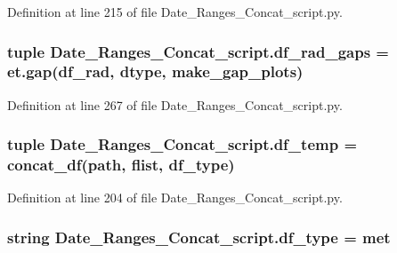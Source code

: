 Definition at line 215 of file Date\+\_\+\+Ranges\+\_\+\+Concat\+\_\+script.\+py.

\hypertarget{namespace_date___ranges___concat__script_a51d248766e4b3ed7f69e33a65a3e3e16}{}
\subsubsection[{df\+\_\+rad\+\_\+gaps}]{\setlength{\rightskip}{0pt plus 5cm}tuple Date\+\_\+\+Ranges\+\_\+\+Concat\+\_\+script.\+df\+\_\+rad\+\_\+gaps = et.\+gap({\bf df\+\_\+rad}, {\bf dtype}, {\bf make\+\_\+gap\+\_\+plots})}\label{namespace_date___ranges___concat__script_a51d248766e4b3ed7f69e33a65a3e3e16}


Definition at line 267 of file Date\+\_\+\+Ranges\+\_\+\+Concat\+\_\+script.\+py.

\hypertarget{namespace_date___ranges___concat__script_ac8906280d8951e2a35e0bfab0023e8ff}{}
\subsubsection[{df\+\_\+temp}]{\setlength{\rightskip}{0pt plus 5cm}tuple Date\+\_\+\+Ranges\+\_\+\+Concat\+\_\+script.\+df\+\_\+temp = {\bf concat\+\_\+df}({\bf path}, {\bf flist}, {\bf df\+\_\+type})}\label{namespace_date___ranges___concat__script_ac8906280d8951e2a35e0bfab0023e8ff}


Definition at line 204 of file Date\+\_\+\+Ranges\+\_\+\+Concat\+\_\+script.\+py.

\hypertarget{namespace_date___ranges___concat__script_ac33a88b539edf5ce073799879c45e2e8}{}
\subsubsection[{df\+\_\+type}]{\setlength{\rightskip}{0pt plus 5cm}string Date\+\_\+\+Ranges\+\_\+\+Concat\+\_\+script.\+df\+\_\+type = \textquotesingle{}met\textquotesingle{}}\label{namespace_date___ranges___concat__script_ac33a88b539edf5ce073799879c45e2e8}


